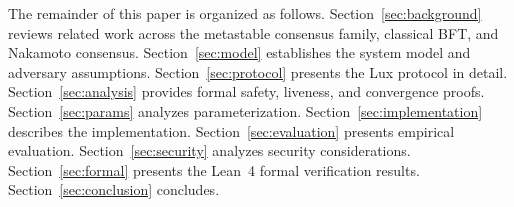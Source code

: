 The remainder of this paper is organized as follows. Section~\ref{sec:background} reviews
related work across the metastable consensus family, classical BFT, and Nakamoto consensus.
Section~\ref{sec:model} establishes the system model and adversary assumptions.
Section~\ref{sec:protocol} presents the Lux protocol in detail.
Section~\ref{sec:analysis} provides formal safety, liveness, and convergence proofs.
Section~\ref{sec:params} analyzes parameterization.
Section~\ref{sec:implementation} describes the implementation.
Section~\ref{sec:evaluation} presents empirical evaluation.
Section~\ref{sec:security} analyzes security considerations.
Section~\ref{sec:formal} presents the Lean~4 formal verification results.
Section~\ref{sec:conclusion} concludes.

